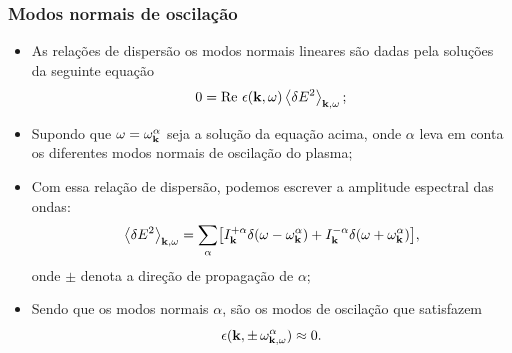 \documentclass[10pt,aspectratio=1610,lualatex]{beamer}
\begin{document}
\begin{frame}
  \frametitle{Modos normais de oscilação}
  \begin{itemize}
    \item As relações de dispersão os modos normais lineares
    são dadas pela soluções da seguinte equação
    \begin{equation}
      0=\mbox{Re}\ \epsilon({\bf k},\omega)
      \left<\delta E^2 \right>_{{\bf k},\omega};
      \label{real-lin}
    \end{equation}
    \vspace{-0.6cm}
    \pause
    \item Supondo que $\omega=\omega^{\alpha}_{\bf k}$ seja a solução
    da equação acima, onde $\alpha$ leva em conta os diferentes modos
    normais de oscilação do plasma;
    \vspace{0.2cm}
    \pause
    \item Com essa relação de dispersão, podemos escrever a
    amplitude espectral das ondas:
    \begin{equation}
      \left<\delta E^2\right>_{{\bf k},\omega}
      =\sum_{\alpha}\bigl[I^{+\alpha}_{\bf k}
      \delta(\omega-\omega_{\bf k}^{\alpha})
      +I^{-\alpha}_{\bf k} \delta(\omega+\omega_{\bf k}^{\alpha})\bigr],
      \label{wave-dens}
    \end{equation}
    onde $\pm$ denota a direção de propagação de $\alpha$;
    \vspace{0.2cm}
    \pause
    \item Sendo que os modos normais $\alpha$, são os modos de
    oscilação que satisfazem
    \begin{equation}
      \label{eigenmode}
      \epsilon({\bf k,\pm\, \omega_{{\bf k},\omega}^\alpha}) \approx 0.
    \end{equation}
  \end{itemize}
\end{frame}
\end{document}
